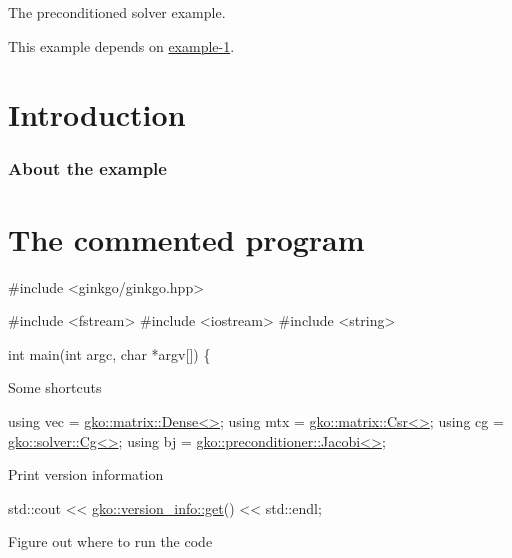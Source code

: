 The preconditioned solver example.

This example depends on \hyperlink{example_1}{example-\/1}.

 \label{_Intro}%
 \label{_Introduction}%
\section*{Introduction}

\label{_Abouttheexample}%
\subsubsection*{About the example }

\label{_CommProg}%
 \section*{The commented program}


\begin{DoxyCode}
\textcolor{preprocessor}{#include <ginkgo/ginkgo.hpp>}


\textcolor{preprocessor}{#include <fstream>}
\textcolor{preprocessor}{#include <iostream>}
\textcolor{preprocessor}{#include <string>}


\textcolor{keywordtype}{int} main(\textcolor{keywordtype}{int} argc, \textcolor{keywordtype}{char} *argv[])
\{
\end{DoxyCode}


Some shortcuts


\begin{DoxyCode}
\textcolor{keyword}{using} vec = \hyperlink{classgko_1_1matrix_1_1Dense}{gko::matrix::Dense<>};
\textcolor{keyword}{using} mtx = \hyperlink{classgko_1_1matrix_1_1Csr}{gko::matrix::Csr<>};
\textcolor{keyword}{using} cg = \hyperlink{classgko_1_1solver_1_1Cg}{gko::solver::Cg<>};
\textcolor{keyword}{using} bj = \hyperlink{classgko_1_1preconditioner_1_1Jacobi}{gko::preconditioner::Jacobi<>};
\end{DoxyCode}


Print version information


\begin{DoxyCode}
std::cout << \hyperlink{classgko_1_1version__info_a6daeb8a087cfb57fa055526fc133d8eb}{gko::version\_info::get}() << std::endl;
\end{DoxyCode}


Figure out where to run the code


